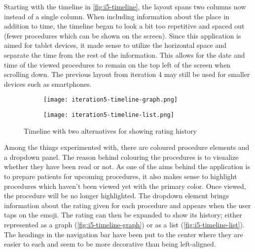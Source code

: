 Starting with the timeline in \autoref{fig:i5-timeline}, the layout spans two columns now instead of a single column. When including information about the place in addition to time, the timeline began to look a bit too repetitive and spaced out (fewer procedures which can be shown on the screen). Since this application is aimed for tablet devices, it made sense to utilize the horizontal space and separate the time from the rest of the information. This allows for the date and time of the viewed procedures to remain on the top left of the screen when scrolling down. The previous layout from iteration 4 may still be used for smaller devices such as smartphones.

\begin{figure}
    \centering
    \begin{subfigure}{0.45\textwidth}
        \centering
        \texttt{[image: iteration5-timeline-graph.png]}
        \label{fig:i5-timeline-graph}
    \end{subfigure}
    \begin{subfigure}{0.45\textwidth}
        \centering
        \texttt{[image: iteration5-timeline-list.png]}
        \label{fig:i5-timeline-list}
    \end{subfigure}
    \caption{Timeline with two alternatives for showing rating history}
    \label{fig:i5-timeline}
\end{figure}

Among the things experimented with, there are coloured procedure elements and a dropdown panel. The reason behind colouring the procedures is to visualize whether they have been read or not. As one of the aims behind the application is to prepare patients for upcoming procedures, it also makes sense to highlight procedures which haven't been viewed yet with the primary color. Once viewed, the procedure will be no longer highlighted. The dropdown element brings information about the rating given for each procedure and appears when the user taps on the emoji. The rating can then be expanded to show its history; either represented as a graph (\autoref{fig:i5-timeline-graph}) or as a list (\autoref{fig:i5-timeline-list}). The headings in the navigation bar have been put to the center where they are easier to each and seem to be more decorative than being left-aligned.

